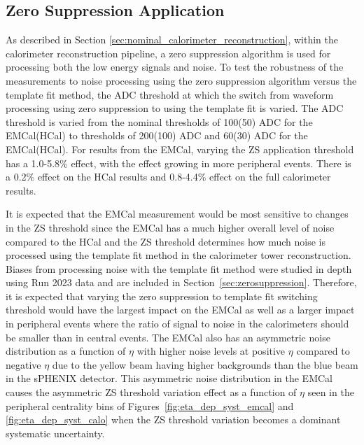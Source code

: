\subsection{Zero Suppression Application}
As described in Section \ref{sec:nominal_calorimeter_reconstruction}, within the calorimeter reconstruction pipeline, a zero suppression algorithm is used for processing both the low energy signals and noise. 
To test the robustness of the \detdeta measurements to noise processing using the zero suppression algorithm versus the template fit method, the ADC threshold at which the switch from waveform processing using zero suppression to using the template fit is varied. 
The ADC threshold is varied from the nominal thresholds of 100(50) ADC for the EMCal(HCal) to thresholds of 200(100) ADC and 60(30) ADC for the EMCal(HCal). 
For \detdeta results from the EMCal, varying the ZS application threshold has a 1.0-5.8\% effect, with the effect growing in more peripheral events. 
There is a 0.2\% effect on the HCal \detdeta results and 0.8-4.4\% effect on the full calorimeter \detdeta results. 

It is expected that the EMCal measurement would be most sensitive to changes in the ZS threshold since the EMCal has a much higher overall level of noise compared to the HCal and the ZS threshold determines how much noise is processed using the template fit method in the calorimeter tower reconstruction.
Biases from processing noise with the template fit method were studied in depth using Run 2023 data and are included in Section~\ref{sec:zerosuppression}.
Therefore, it is expected that varying the zero suppression to template fit switching threshold would have the largest impact on the EMCal as well as a larger impact in peripheral events where the ratio of signal to noise in the calorimeters should be smaller than in central events. 
The EMCal also has an asymmetric noise distribution as a function of $\eta$ with higher noise levels at positive $\eta$ compared to negative $\eta$ due to the yellow beam having higher backgrounds than the blue beam in the sPHENIX detector.
This asymmetric noise distribution in the EMCal causes the asymmetric ZS threshold variation effect as a function of $\eta$ seen in the peripheral centrality bins of Figures~\ref{fig:eta_dep_syst_emcal} and \ref{fig:eta_dep_syst_calo} when the ZS threshold variation becomes a dominant systematic uncertainty. 

